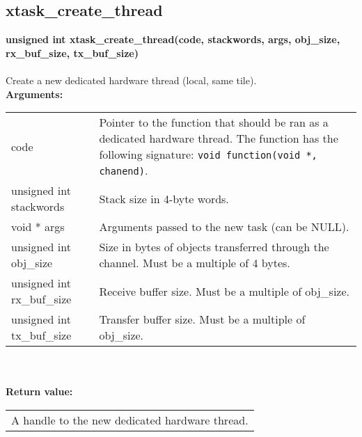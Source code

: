 \begin{samepage}
\subsection{xtask\_create\_thread}
\noindent
\textbf{unsigned int xtask\_create\_thread(code, stackwords, args, obj\_size, rx\_buf\_size, tx\_buf\_size)}\\\\
Create a new dedicated hardware thread (local, same tile).\\

\noindent
\textbf{Arguments:}\\
\indent\begin{tabular}{ p{4.5cm}  p{9cm} }
code                        & Pointer to the function that should be ran as a
                              dedicated hardware thread.
                              The function has the following signature: 
                              \verb|void function(void *, chanend)|.\\
unsigned int stackwords     & Stack size in 4-byte words.\\
void * args                 & Arguments passed to the new task (can be NULL).\\
unsigned int obj\_size      & Size in bytes of objects transferred through 
                              the channel.
                              Must be a multiple of 4 bytes.\\
unsigned int rx\_buf\_size  & Receive buffer size. Must be a multiple of obj\_size.\\
unsigned int tx\_buf\_size  & Transfer buffer size. Must be a multiple of obj\_size.       
\end{tabular}\\\\

\noindent
\textbf{Return value:}\\
\indent\begin{tabular}{  p{13.5cm} }
A handle to the new dedicated hardware thread.
\end{tabular}
\end{samepage}

